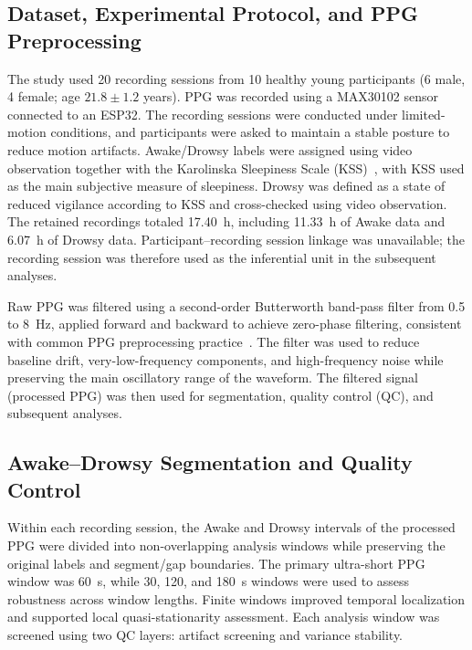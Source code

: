 \subsection{Dataset, Experimental Protocol, and PPG Preprocessing}

The study used 20 recording sessions from 10 healthy young participants (6 male, 4 female; age $21.8 \pm 1.2$ years). PPG was recorded using a MAX30102 sensor connected to an ESP32. The recording sessions were conducted under limited-motion conditions, and participants were asked to maintain a stable posture to reduce motion artifacts. Awake/Drowsy labels were assigned using video observation together with the Karolinska Sleepiness Scale (KSS)~\cite{akerstedt1990}, with KSS used as the main subjective measure of sleepiness. Drowsy was defined as a state of reduced vigilance according to KSS and cross-checked using video observation. The retained recordings totaled 17.40~h, including 11.33~h of Awake data and 6.07~h of Drowsy data. Participant--recording session linkage was unavailable; the recording session was therefore used as the inferential unit in the subsequent analyses.

Raw PPG was filtered using a second-order Butterworth band-pass filter from 0.5 to 8~Hz, applied forward and backward to achieve zero-phase filtering, consistent with common PPG preprocessing practice~\cite{charlton2023,park2022}. The filter was used to reduce baseline drift, very-low-frequency components, and high-frequency noise while preserving the main oscillatory range of the waveform. The filtered signal (processed PPG) was then used for segmentation, quality control (QC), and subsequent analyses.

\subsection{Awake--Drowsy Segmentation and Quality Control}

Within each recording session, the Awake and Drowsy intervals of the processed PPG were divided into non-overlapping analysis windows while preserving the original labels and segment/gap boundaries. The primary ultra-short PPG window was 60~s, while 30, 120, and 180~s windows were used to assess robustness across window lengths. Finite windows improved temporal localization and supported local quasi-stationarity assessment. Each analysis window was screened using two QC layers: artifact screening and variance stability.

